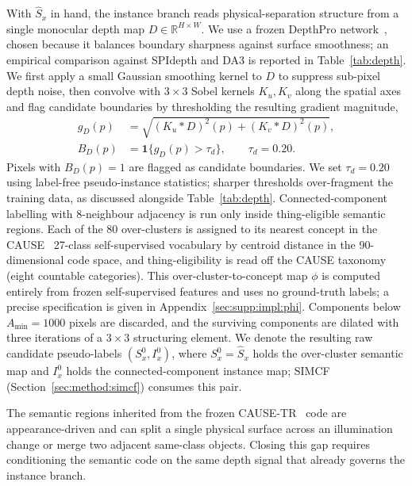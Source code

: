 \documentclass{article}
\begin{document}
With $\hat S_x$ in hand, the instance branch reads physical-separation structure from a single monocular depth map $D \in \mathbb{R}^{H \times W}$. We use a frozen DepthPro network~\cite{bochkovskii2024depthpro}, chosen because it balances boundary sharpness against surface smoothness; an empirical comparison against SPIdepth and DA3 is reported in Table~\ref{tab:depth}. We first apply a small Gaussian smoothing kernel to $D$ to suppress sub-pixel depth noise, then convolve with $3 \times 3$ Sobel kernels $K_u, K_v$ along the spatial axes and flag candidate boundaries by thresholding the resulting gradient magnitude,
\begin{equation}
\begin{aligned}
g_D(p) &= \sqrt{(K_u * D)^2(p) + (K_v * D)^2(p)}, \\
B_D(p) &= \mathbf{1}\{g_D(p) > \tau_d\}, \qquad \tau_d = 0.20 .
\end{aligned}
\label{eq:depth_boundary}
\end{equation}
Pixels with $B_D(p)=1$ are flagged as candidate boundaries. We set $\tau_d = 0.20$ using label-free pseudo-instance statistics; sharper thresholds over-fragment the training data, as discussed alongside Table~\ref{tab:depth}. Connected-component labelling with 8-neighbour adjacency is run only inside thing-eligible semantic regions. Each of the 80 over-clusters is assigned to its nearest concept in the CAUSE~\cite{kim2024cause} 27-class self-supervised vocabulary by centroid distance in the 90-dimensional code space, and thing-eligibility is read off the CAUSE taxonomy~\cite{kim2024cause} (eight countable categories). This over-cluster-to-concept map $\phi$ is computed entirely from frozen self-supervised features and uses no ground-truth labels; a precise specification is given in Appendix~\ref{sec:supp:impl:phi}. Components below $A_\text{min} = 1000$ pixels are discarded, and the surviving components are dilated with three iterations of a $3 \times 3$ structuring element. We denote the resulting raw candidate pseudo-labels $(S_x^0, I_x^0)$, where $S_x^0 = \hat S_x$ holds the over-cluster semantic map and $I_x^0$ holds the connected-component instance map; SIMCF (Section~\ref{sec:method:simcf}) consumes this pair.

The semantic regions inherited from the frozen CAUSE-TR~\cite{kim2024cause} code are appearance-driven and can split a single physical surface across an illumination change or merge two adjacent same-class objects. Closing this gap requires conditioning the semantic code on the same depth signal that already governs the instance branch.
\end{document}
